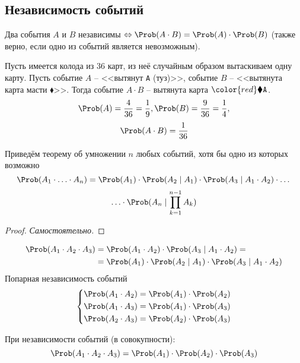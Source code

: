 \subsection{Независимость событий}
\begin{definition}
	Два события $A$ и $B$ независимы $\Leftrightarrow \Prob(A \cdot B) = \Prob(A) \cdot \Prob(B)$ (также верно, если одно из событий является невозможным).
\end{definition}
\begin{example}
	Пусть имеется колода из 36 карт, из неё случайным образом вытаскиваем одну карту. Пусть событие $A$ -- <<вытянут \texttt{A} (туз)>>, событие $B$ -- <<вытянута карта масти {\color{red} $\blacklozenge$}>>. Тогда событие $A \cdot B$ -- вытянута карта ${\color{red} \blacklozenge} \texttt{A}$.
	\[
		\Prob(A) = \frac{4}{36} = \frac{1}{9}, \Prob(B) = \frac{9}{36} = \frac{1}{4},
	\]
	\[
		\Prob(A \cdot B) = \frac{1}{36}
	\]
\end{example}
Приведём теорему об умножении $n$ любых событий, хотя бы одно из которых возможно
\[
	\Prob(A_1 \cdot \ldots \cdot A_n) = \Prob(A_1) \cdot \Prob(A_2 \mid A_1) \cdot \Prob(A_3 \mid A_1 \cdot A_2) \cdot \dots
\]
\[
	\ldots \cdot \Prob(A_n \mid \prod\limits_{k = 1}^{n-1} A_k)
\]
\begin{proof}
\textit{Самостоятельно.}
\end{proof}
\[ \begin{split}
	\Prob(A_1 \cdot A_2 \cdot A_3) &= \Prob(A_1 \cdot A_2) \cdot \Prob(A_3 \mid A_1 \cdot A_2) = \\
	&= \Prob(A_1) \cdot \Prob(A_2 \mid A_1) \cdot \Prob(A_3 \mid A_1 \cdot A_2)
\end{split} \]
Попарная независимость событий
\begin{equation}\label{1-5-3}
	\left\{ \begin{aligned}
		&\Prob(A_1 \cdot A_2) = \Prob(A_1) \cdot \Prob(A_2) \\
		&\Prob(A_1 \cdot A_3) = \Prob(A_1) \cdot \Prob(A_3) \\
		&\Prob(A_2 \cdot A_3) = \Prob(A_2) \cdot \Prob(A_3)
	\end{aligned} \right.
\end{equation}

При независимости событий (в совокупности):
\begin{equation}\label{1-5-4}
	\Prob(A_1 \cdot A_2 \cdot A_3) = \Prob(A_1) \cdot \Prob(A_2) \cdot \Prob(A_3)
\end{equation}
